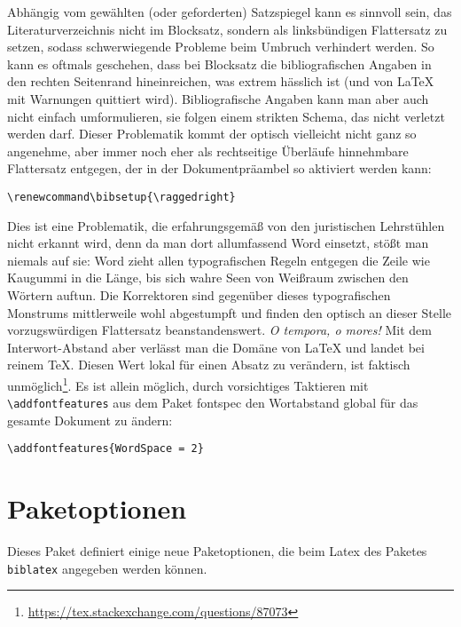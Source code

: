 \documentclass[11pt,a4paper,DIV=calc]{scrartcl}
\newcommand\software[1]{\textsf{#1}}
\renewcommand\bibsetup{\raggedright}
\begin{document}
Abhängig vom gewählten (oder geforderten) Satzspiegel kann es sinnvoll
sein, das Literaturverzeichnis nicht im Blocksatz, sondern als
linksbündigen Flattersatz zu setzen, sodass schwerwiegende Probleme
beim Umbruch verhindert werden. So kann es oftmals geschehen, dass bei
Blocksatz die bibliografischen Angaben in den rechten Seitenrand
hineinreichen, was extrem hässlich ist (und von \LaTeX{} mit Warnungen
quittiert wird). Bibliografische Angaben kann man aber auch nicht
einfach umformulieren, sie folgen einem strikten Schema, das nicht
verletzt werden darf. Dieser Problematik kommt der optisch vielleicht
nicht ganz so angenehme, aber immer noch eher als rechtseitige
Überläufe hinnehmbare Flattersatz entgegen, der in der
Dokumentpräambel so aktiviert werden kann:

\begin{verbatim}
\renewcommand\bibsetup{\raggedright}
\end{verbatim}

Dies ist eine Problematik, die erfahrungsgemäß von den juristischen
Lehrstühlen nicht erkannt wird, denn da man dort allumfassend
\software{Word} einsetzt, stößt man niemals auf sie: \software{Word}
zieht allen typografischen Regeln entgegen die Zeile wie Kaugummi in
die Länge, bis sich wahre Seen von Weißraum zwischen den Wörtern
auftun. Die Korrektoren sind gegenüber dieses typografischen Monstrums
mittlerweile wohl abgestumpft und finden den optisch an dieser Stelle
vorzugswürdigen Flattersatz beanstandenswert. \emph{O tempora, o
  mores!} Mit dem Interwort-Abstand aber verlässt man die Domäne von
\LaTeX{} und landet bei reinem \TeX{}. Diesen Wert lokal für einen
Absatz zu verändern, ist faktisch
unmöglich\footnote{\url{https://tex.stackexchange.com/questions/87073}}. Es
ist allein möglich, durch vorsichtiges Taktieren mit
\verb+\addfontfeatures+ aus dem Paket \software{fontspec} den
Wortabstand global für das gesamte Dokument zu ändern:

\begin{verbatim}
\addfontfeatures{WordSpace = 2}
\end{verbatim}

\section{Paketoptionen}\label{sec:optionen}

Dieses Paket definiert einige neue Paketoptionen, die beim Latex des
Paketes \verb+biblatex+ angegeben werden können.
\end{document}
